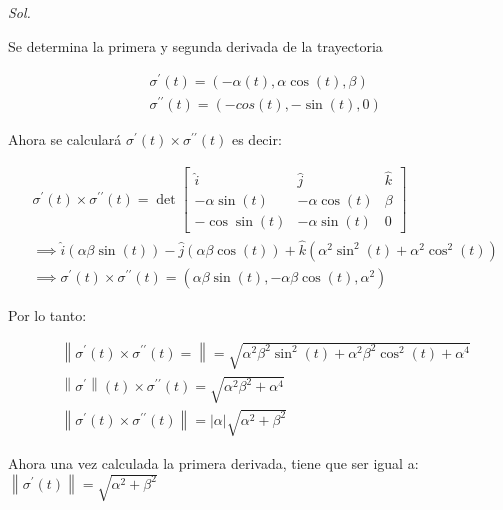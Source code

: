 \textit{ Sol. }

Se determina la primera
y segunda derivada de la trayectoria

\begin{align*}
	 & \sigma^{\prime} (t)=\left(-\alpha(t),\alpha\cos{(t)},\beta \right) \\
	 & \sigma^{\prime\prime}(t)=\left(-cos{(t)},-\sin{(t)},0\right)
\end{align*}

Ahora se calculará $\sigma^{\prime} (t)\times \sigma^{\prime\prime}(t)$ es decir:

\begin{align*}
	 & \sigma^{\prime} (t)\times\sigma^{\prime\prime}(t)=\det \begin{bmatrix}
		                                                          \hat{i}          & \hat{j}          & \hat{k} \\
		                                                          -\alpha\sin{(t)} & -\alpha\cos{(t)} & \beta   \\
		                                                          -\cos\sin{(t)}   & -\alpha\sin{(t)} & 0
	                                                          \end{bmatrix}                                                   \\
	 & \implies \hat{i}\left(\alpha\beta\sin{(t)}\right)-\hat{j}\left(\alpha\beta\cos{(t)}\right)+\hat{k}\left(\alpha^2\sin^2{(t)}+\alpha^2\cos^2{(t)}\right) \\
	 & \implies \sigma^{\prime} (t)\times\sigma^{\prime\prime}(t)=\left(\alpha\beta\sin{(t)},-\alpha\beta\cos{(t)},\alpha^2\right)
\end{align*}

Por lo tanto:

\begin{align*}
	 & \left\lVert  \sigma^{\prime} (t)\times\sigma^{\prime\prime}(t)=\right\rVert =\sqrt{\alpha^2\beta^2\sin^2{(t)}+\alpha^2\beta^2\cos^2{(t)}+\alpha^4} \\
	 & \left\lVert  \sigma^{\prime}\right\rVert (t)\times\sigma^{\prime\prime}(t)=\sqrt{\alpha^2\beta^2+\alpha^4}                                         \\
	 & \left\lVert  \sigma^{\prime} (t)\times\sigma^{\prime\prime}(t)\right\rVert=\left\lvert \alpha\right\rvert \sqrt{\alpha^2+\beta^2}
\end{align*}

Ahora una vez calculada la primera derivada, tiene que ser igual a: $\left\lVert \sigma^{\prime} (t)\right\rVert=\sqrt{\alpha^2+\beta^2} $


